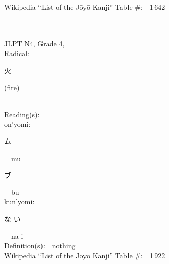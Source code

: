 \begin{multicols}{2}
Wikipedia ``List of the J\=oy\=o Kanji'' Table \#:\ \ 1\,642 \\
\ \ \\
{\fontsize{34pt}{40pt}  }\ \ \\  %
{JLPT N4, Grade 4, \\Radical:\ \ {\begin{CJK}{UTF8}{min} 火 \end{CJK}} (fire) } \\
Reading(s):\ \ \\
{\hspace*{1em}}on'yomi:\ \ \\
{\hspace*{2em}}{\begin{CJK}{UTF8}{min} ム \end{CJK}}\ \ mu\ \ \\
{\hspace*{2em}}{\begin{CJK}{UTF8}{min} ブ \end{CJK}}\ \ bu\ \ \\
{\hspace*{1em}}kun'yomi:\ \ \\
{\hspace*{2em}}{\begin{CJK}{UTF8}{min} な-い \end{CJK}}\ \ na-i\ \ \\
Definition(s):\ \ nothing \\
Wikipedia ``List of the J\=oy\=o Kanji'' Table \#:\ \ 1\,922 \\
\ \ \\
\end{multicols}



